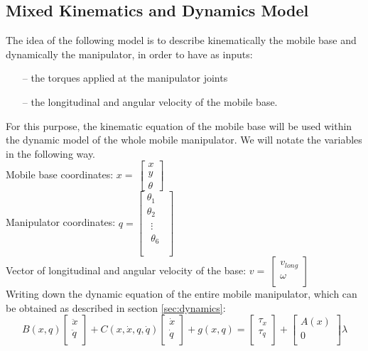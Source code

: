 \subsection{Mixed Kinematics and Dynamics Model}
The idea of the following model is to describe kinematically the mobile base and dynamically the manipulator, in order to have as inputs:
\begin{itemize}\itemsep1pt
	\item[--] the torques applied at the manipulator joints
	\item[--] the longitudinal and angular velocity of the mobile base.
\end{itemize}
For this purpose, the kinematic equation of the mobile base will be used within the dynamic model of the whole mobile manipulator. 
We will notate the variables in the following way.\\
Mobile base coordinates: $x=\ \left[\begin{matrix}x\\y\\\theta\end{matrix}\right]$\\
Manipulator coordinates: $ q=\left[\begin{matrix}\theta_1\\\theta_2\\\begin{matrix}\vdots\\\theta_6\\\end{matrix}\\\end{matrix}\right]$\\
Vector of longitudinal and angular velocity of the base: $v=\ \left[\begin{matrix}v_{long}\\\omega\\\end{matrix}\right]$\\
Writing down the dynamic equation of the entire mobile manipulator, which can be obtained as described in section \ref{sec:dynamics}:
\begin{equation}
	B\left(x,q\right)\left[
		\begin{matrix}\ddot{x}\\\ddot{q}\\
	\end{matrix}
	\right]+C\left(x,\dot{x},q,\dot{q}\right)\left[
	\begin{matrix}
		\dot{x}\\\dot{q}\\
	\end{matrix}\right]+g\left(x,q\right)= \left[
	\begin{matrix}
		\tau_x\\\tau_q\\
	\end{matrix}\right]+\left[
	\begin{matrix}
		A(x)\\0\\
	\end{matrix}\right]\lambda
\end{equation}
